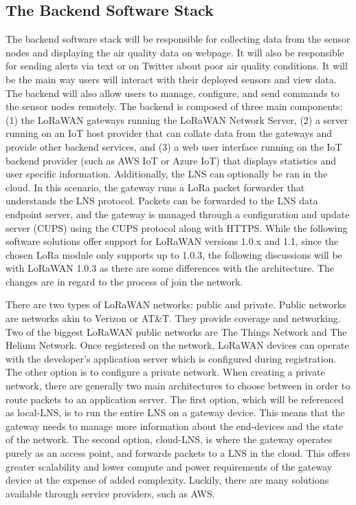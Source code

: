\subsection{The Backend Software Stack}
The backend software stack will be responsible for collecting data from the
sensor nodes and displaying the air quality data on webpage. It will also be
responsible for sending alerts via text or on Twitter about poor air quality
conditions. It will be the main way users will interact with their deployed
sensors and view data. The backend will also allow users to manage, configure,
and send commands to the sensor nodes remotely. The backend is composed of three
main components: (1) the LoRaWAN gateways running the LoRaWAN Network Server,
(2) a server running on an IoT host provider that can collate data from the
gateways and provide other backend services, and (3) a web user interface
running on the IoT backend provider (such as AWS IoT or Azure IoT) that displays
statistics and user specific information. Additionally, the LNS can optionally
be ran in the cloud. In this scenario, the gateway runs a LoRa packet forwarder
that understands the LNS protocol. Packets can be forwarded to the LNS data
endpoint server, and the gateway is managed through a configuration and update
server (CUPS) using the CUPS protocol along with HTTPS. While the following
software solutions offer support for LoRaWAN versions 1.0.x and 1.1, since the
chosen LoRa module only supports up to 1.0.3, the following discussions will be
with LoRaWAN 1.0.3 as there are some differences with the architecture. The
changes are in regard to the process of join the network. 

There are two types of LoRaWAN networks: public and private. Public networks are
networks akin to Verizon or AT\&T. They provide coverage and networking. Two of
the biggest LoRaWAN public networks are The Things Network and The Helium
Network. Once registered on the network, LoRaWAN devices can operate with the
developer's application server which is configured during registration. The
other option is to configure a private network. When creating a private network,
there are generally two main architectures to choose between in order to route
packets to an application server. The first option, which will be referenced as
local-LNS, is to run the entire LNS on a gateway device. This means that the
gateway needs to manage more information about the end-devices and the state of
the network. The second option, cloud-LNS, is where the gateway operates purely
as an access point, and forwards packets to a LNS in the cloud.  This offers
greater scalability and lower compute and power requirements of the gateway
device at the expense of added complexity. Luckily, there are many solutions
available through service providers, such as AWS.


